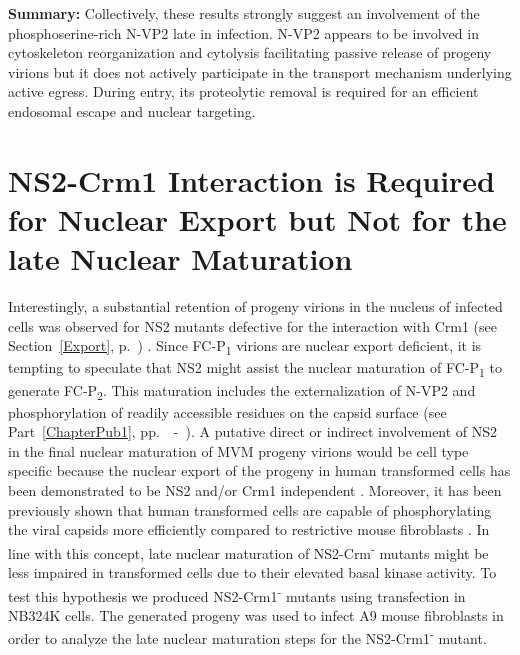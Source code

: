 \medskip
\textbf{Summary:} Collectively, these results strongly suggest an involvement of the phosphoserine-rich N-VP2 late in infection. N-VP2 appears to be involved in cytoskeleton reorganization and cytolysis facilitating passive release of progeny virions but it does not actively participate in the transport mechanism underlying active egress. During entry, its proteolytic removal is required for an efficient endosomal escape and nuclear targeting.         


\clearpage
\section{NS2-Crm1 Interaction is Required for Nuclear Export but Not for the late Nuclear Maturation}

Interestingly, a substantial retention of progeny virions in the nucleus of infected cells was observed for NS2 mutants defective for the interaction with Crm1 (see Section~\ref{Export}, p.~\pageref{Export}) \cite{pmid12239307, pmid11884550}. Since FC-P\textsubscript{1} virions are nuclear export deficient, it is tempting to speculate that NS2 might assist the nuclear maturation of FC-P\textsubscript{1} to generate FC-P\textsubscript{2}. This maturation includes the externalization of N-VP2 and phosphorylation of readily accessible residues on the capsid surface (see Part~\ref{ChapterPub1}, pp.~\pageref{ChapterPub1}~-~\pageref{ChapterPub1End}). A putative direct or indirect involvement of NS2 in the final nuclear maturation of MVM progeny virions would be cell type specific because the nuclear export of the progeny in human transformed cells has been demonstrated to be NS2 and/or Crm1 independent \cite{pmid2147041, pmid15367635}. Moreover, it has been previously shown that human transformed cells are capable of phosphorylating the viral capsids more efficiently compared to restrictive mouse fibroblasts \cite{pmid11069983}. In line with this concept, late nuclear maturation of NS2-Crm\textsuperscript{-} mutants might be less impaired in transformed cells due to their elevated basal kinase activity. To test this hypothesis we produced NS2-Crm1\textsuperscript{-} mutants using transfection in NB324K cells. The generated progeny was used to infect A9 mouse fibroblasts in order to analyze the late nuclear maturation steps for the NS2-Crm1\textsuperscript{-} mutant.       

